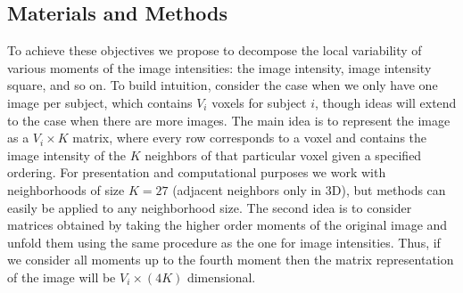 \documentclass[a0,landscape]{a0poster}
\begin{document}
\begin{multicols}{3}
\large{\section*{\color{uwred}Materials and Methods}}
\hspace{1cm}To achieve these objectives we propose to decompose the local variability of various moments of the image intensities: the image intensity, image  intensity square, and so on. To build intuition, consider the case when we only have one image per subject, which contains $V_i$ voxels for subject $i$, though ideas will extend to the case when there are more images.  The main idea is to represent the image as a $V_i\times K$ matrix, where every row corresponds to a voxel and contains the image intensity of the $K$ neighbors of that particular voxel given a specified ordering. For presentation and computational purposes we work with neighborhoods of size $K=27$ (adjacent neighbors only in 3D), but methods can easily be applied to any neighborhood size.  The second idea is to consider matrices obtained by taking the higher order moments of the original image and unfold them using the same procedure as the one for image intensities.  Thus, if we consider all moments up to the fourth moment then the matrix representation of the image will be $V_i\times (4K)$ dimensional.


\end{multicols}
\end{document}
